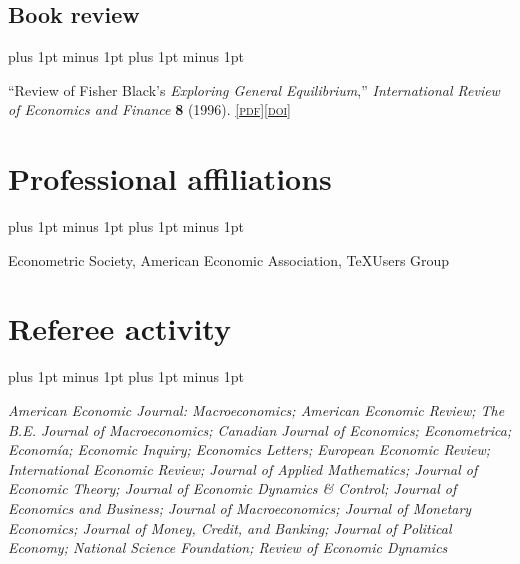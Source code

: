 \documentclass[letterpaper]{article}
\renewenvironment{itemize}{
  \begin{list}{}{
    \setlength{\leftmargin}{1.5em}
    \itemsep -1pt plus 1pt minus 1pt
    \topsep -1pt plus 1pt minus 1pt
  }
}{
  \end{list}
}
\newcommand{\pdf}[1]{\href{#1}{\scriptsize\textsc{[pdf]}}}
\newcommand{\doi}[1]{\href{http://dx.doi.org/#1}{\scriptsize\textsc{[doi]}}}
\begin{document}
\subsection*{Book review}
\begin{itemize}
\item ``Review of Fisher Black's \textit{Exploring General Equilibrium},'' \textit{International Review of Economics and Finance} \textbf{8} (1996). \pdf{https://jimdolmas.github.io/assets/fisher_black.pdf}\doi{10.1016/S1059-0560(96)90038-6}
\end{itemize}

\section*{Professional affiliations}
\begin{itemize}
\item Econometric Society, American Economic Association, \TeX Users Group
\end{itemize}

\section*{Referee activity}
\begin{itemize}
\item\textit{American Economic Journal: Macroeconomics; American Economic Review; The B.E. Journal of Macroeconomics; Canadian Journal of Economics; Econometrica; Econom\'{i}a; Economic Inquiry; Economics Letters; European Economic Review; International Economic Review; Journal of Applied Mathematics; Journal of Economic Theory; Journal of Economic Dynamics \& Control; Journal of Economics and Business; Journal of Macroeconomics; Journal of Monetary Economics; Journal of Money, Credit, and Banking; Journal of Political Economy; National Science Foundation; Review of Economic Dynamics}
\end{itemize}
\end{document}
